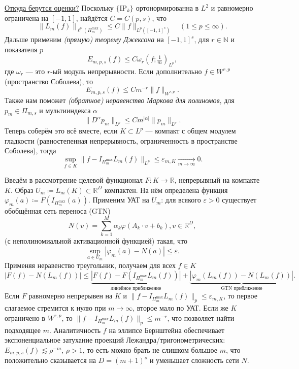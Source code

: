 \documentclass[../NDCNNAI_main.tex]{subfiles}
\begin{document}
\underline{Откуда берутся оценки?}
Поскольку $\{\mathrm{IP}_k\}$ ортонормированна в $L^2$ и равномерно ограничена на $[-1, 1]$, найдётся $C = C(p,s)$, что
$$\|L_m(f)\|_{\ell^p(\Pi_m^{\max})} \le C \|f\|_{L^p([-1,1]^s)} \quad (1 \leq p \leq \infty).$$
Дальше применим \emph{(прямую) теорему Джексона} на $[-1, 1]^s$, для $r \in \mathbb{N}$ и показателя $p$
$$E_{m,p,s}(f) \le C \omega_r \left( f; \tfrac{1}{m} \right)_{L^p},$$
где $\omega_r$ --- это $r$-ый модуль непрерывности.
Если дополнительно $f \in W^{r, p}$ (пространство Соболева), то
$$E_{m,p,s}(f) \le C m^{-r} \|f\|_{W^{r,p}}.$$
Также нам поможет \emph{(обратное) неравенство Маркова для полиномов}, для $p_m \in \Pi_{m, s}$ и мультииндекса $\alpha$
$$\|D^\alpha p_m\|_{L^p} \le C m^{|\alpha|} \|p_m\|_{L^p}.$$
Теперь соберём это всё вместе, если $K \subset L^p$ --- компакт с общем модулем гладкости (равностепенная непрерывность, ограниченность в пространстве Соболева), тогда
$$\sup_{f \in K} \|f - I_{\Pi_m^{\max}} L_m(f)\|_{L^p} \leq \varepsilon_{m,K} \xrightarrow[m \to \infty]{} 0.$$

Введём в рассмотрение целевой функционал $F\colon K \to \mathbb{R}$, непрерывный на компакте $K$.
Образ $U_m \coloneq L_m(K) \subset \mathbb{R}^D$ компактен.
На нём определена функция $\varphi_m(a) \coloneq F(I_{\Pi_m^{\max}}(a))$.
Применим УАТ на $U_m$: для всякого $\varepsilon > 0$ существует обобщённая сеть переноса (GTN)
$$N(v) = \sum_{k = 1}^M \alpha_k\varphi(A_k\cdot v + b_k), v \in \mathbb{R}^D,$$
(с неполиномиальной активационной функцией) такая, что
$$\sup_{a \in U_m}|\varphi_m(a) - N(a)| \le \varepsilon.$$
Применяя неравенство треугольник, получаем для всех $f \in K$
$$|F(f) - N(L_m(f))| \le \underbrace{|F(f) - F(I_{\Pi_m^{\max}}L_m(f))|}_{\text{линейное приближение}} + \underbrace{|\varphi_m(L_m(f)) - N(L_m(f))|}_{\text{GTN приближение}}.$$
Если $F$ равномерно непрерывен на $K$ и $\|f - I_{\Pi_m^{\max}}L_m(f)\|_p \le \varepsilon_{m, K}$, то первое слагаемое стремится к нулю при $m \to \infty$, второе мало по УАТ.
Если же $K$ ограничено в $W^{r, p}$, то $\|f - I_{\Pi_m^{\max}}L_m(f)\|_p \le m^{-r}$, что позволяет найти подходящее $m$.
Аналитичность $f$ на эллипсе Бернштейна обеспечивает экспоненциальное затухание проекций Лежандра/тригонометрических: $E_{m,p,s}(f) \lesssim \rho^{-m}$, $\rho > 1$, то есть можно брать не слишком большое $m$, что положительно сказывается на $D = (m + 1)^s$ и уменьшает сложность сети $N$.
\end{document}
